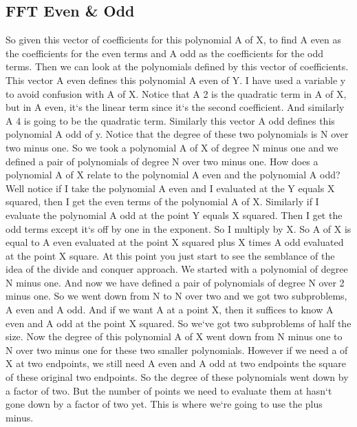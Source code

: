 \subsection{FFT  Even \& Odd}
So given this vector of coefficients for this polynomial A of X, to find A even as the coefficients for the even terms and A odd as the coefficients for the odd terms.
Then we can look at the polynomials defined by this vector of coefficients.
This vector A even defines this polynomial A even of Y\@.
I have used a variable y to avoid confusion with A of X\@.
Notice that A 2 is the quadratic term in A of X, but in A even, it`s the linear term since it`s the second coefficient.
And similarly A 4 is going to be the quadratic term.
Similarly this vector A odd defines this polynomial A odd of y.
Notice that the degree of these two polynomials is N over two minus one.
So we took a polynomial A of X of degree N minus one and we defined a pair of polynomials of degree N over two minus one.
How does a polynomial A of X relate to the polynomial A even and the polynomial A odd? Well notice if I take the polynomial A even and I evaluated at the Y equals X squared, then I get the even terms of the polynomial A of X\@.
Similarly if I evaluate the polynomial A odd at the point Y equals X squared.
Then I get the odd terms except it`s off by one in the exponent.
So I multiply by X\@.
So A of X is equal to A even evaluated at the point X squared plus X times A odd evaluated at the point X square.
At this point you just start to see the semblance of the idea of the divide and conquer approach.
We started with a polynomial of degree N minus one.
And now we have defined a pair of polynomials of degree N over 2 minus one.
So we went down from N to N over two and we got two subproblems, A even and A odd.
And if we want A at a point X, then it suffices to know A even and A odd at the point X squared.
So we`ve got two subproblems of half the size.
Now the degree of this polynomial A of X went down from N minus one to N over two minus one for these two smaller polynomials.
However if we need a of X at two endpoints, we still need A even and A odd at two endpoints the square of these original two endpoints.
So the degree of these polynomials went down by a factor of two.
But the number of points we need to evaluate them at hasn`t gone down by a factor of two yet.
This is where we`re going to use the plus minus.

